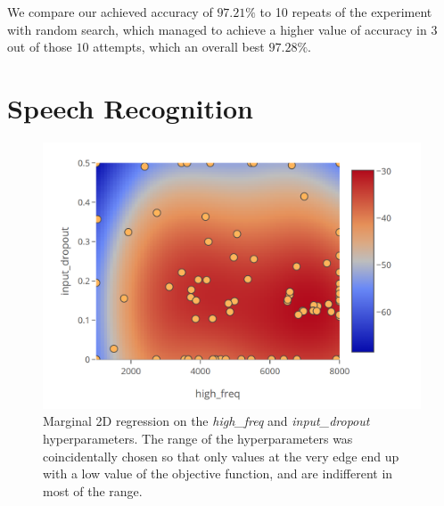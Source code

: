 We compare our achieved accuracy of $97.21\%$ to 10 repeats of the experiment with random search, which managed to achieve a higher value of accuracy in $3$ out of those $10$ attempts, which an overall best $97.28\%$. 

\section{Speech Recognition}

\begin{figure}
	\begin{center}
		\includegraphics[width=1.0\textwidth]{images/speech-2d-almost-insensitive.png}
		\caption{Marginal 2D regression on the \emph{high\_freq} and \emph{input\_dropout} hyperparameters. The range of the hyperparameters was coincidentally chosen so that only values at the very edge end up with a low value of the objective function, and are indifferent in most of the range.}
		\label{figure:2d-almost-insensitive}
	\end{center}
\end{figure}

